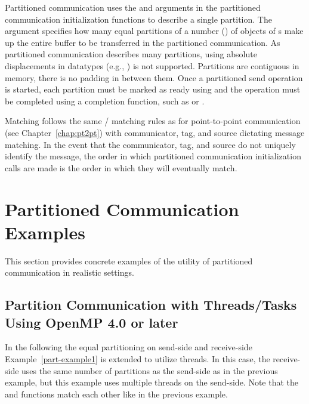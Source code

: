 Partitioned communication uses the  and 
arguments in the partitioned communication initialization functions to describe
a single partition. The argument  specifies how many equal
partitions of a number () of objects of s make up the
entire buffer to be transferred in the partitioned communication. As partitioned
communication describes many partitions, using absolute displacements in datatypes
(e.g., ) is not supported. Partitions are contiguous in memory, there
is no padding in between them.
Once a partitioned send operation is started, each partition must be marked as ready
using  and the operation must be completed using a completion
function, such as  or .


Matching follows the same \MPI/ matching rules as for point-to-point communication (see Chapter~\ref{chap:pt2pt}) with communicator, tag, and source dictating
message matching. In the event that the communicator, tag, and source do not
uniquely identify the message, the order in which partitioned 
communication initialization calls are made is the order in which they will eventually match.

\section{Partitioned Communication Examples}
\label{sec:part-communication-examples}
This section provides concrete examples of the utility of partitioned communication
in realistic settings.
\subsection{Partition Communication with Threads/Tasks Using OpenMP 4.0 or later}
\label{subsec:part-channel-examples}
In the following the equal partitioning on send-side and receive-side Example~\ref{part-example1} is extended
to utilize threads. In this case, the receive-side uses the same
number of partitions as the send-side as in the previous example, but this
example uses multiple threads on the send-side. Note that the
 and  functions match
each other like in the previous example.

